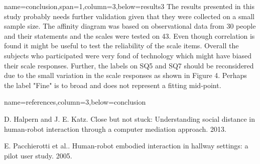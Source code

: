 \documentclass[paperwidth=118cm,paperheight=84cm,landscape,fontscale=0.2941]{baposter}
\begin{document}
\begin{poster}
{name=conclusion,span=1,column=3,below=results3}
{\parskip 5pt
The results presented in this study probably needs further validation given that they were collected on a small sample size. The affinity diagram was based on observational data from 30 people and their statements and the scales were tested on 43. Even though correlation is found it might be useful to test the reliability of the scale items. Overall the subjects who participated were very fond of technology which might have biased their scale responses. Further, the labels on SQ5 and SQ7 should be reconsidered due to the small variation in the scale responses as shown in Figure 4. Perhaps the label "Fine" is to broad and does not represent a fitting mid-point.
}




{name=references,column=3,below=conclusion}
{
\renewcommand{\section}[2]{}%
\footnotesize
\noindent [1] D. Halpern and J. E. Katz. Close but not stuck: Understanding social distance in human-robot interaction through a computer mediation approach. 2013.

\vspace{1pt} 
\noindent [2] E. Pacchierotti et al.. Human-robot embodied interaction in hallway settings: a pilot user study. 2005.

}
\end{poster}
\end{document}
